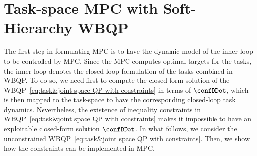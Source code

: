 \section{Task-space MPC with Soft-Hierarchy WBQP}\label{sec-chap5:MPC-QP}
The first step in formulating MPC is to have the dynamic model of the inner-loop to be controlled by MPC. Since the MPC computes optimal targets for the tasks, the inner-loop denotes the closed-loop formulation of the tasks combined in  WBQP. To do so, we need first to compute the closed-form solution of the   WBQP~\eqref{eq:task&joint space QP with constraints} in terms of $\confDDot$, which is then mapped to the task-space to have the corresponding closed-loop task dynamics. Nevertheless, the existence of inequality constraints in WBQP~\eqref{eq:task&joint space QP with constraints} makes it impossible to have an exploitable closed-form solution $\confDDot$. In what follows, we  consider the unconstrained  WBQP~\eqref{eq:task&joint space QP with constraints}. Then, we  show how the constraints can be implemented in MPC.
